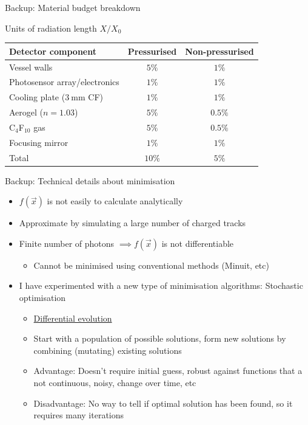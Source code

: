 \documentclass{beamer}
\begin{document}
\begin{frame}{Backup: Material budget breakdown}
  \begin{center}
    Units of radiation length $X/X_0$
    \begin{tabular}{lcc}
        \hline
        Detector component                           & Pressurised & Non-pressurised \\
        \hline
        Vessel walls                                 & $5\%$                         & $1\%$ \\
        Photosensor array/electronics                & $1\%$                         & $1\%$ \\
        Cooling plate ($\SI{3}{\milli\meter}$ CF)    & $1\%$                         & $1\%$ \\
        Aerogel ($n = 1.03$)                         & $5\%$                         & $0.5\%$ \\
        C$_4$F$_10$ gas                              & $5\%$                         & $0.5\%$ \\
        Focusing mirror                              & $1\%$                         & $1\%$ \\
        \hline
        Total                                        & $10\%$                        & $5\%$ \\
        \hline
    \end{tabular}
  \end{center}
\end{frame}

\begin{frame}{Backup: Technical details about minimisation}
  \setlength\itemsep{1.0em}
  \begin{itemize}
    \item{$f(\vec{x})$ is not easily to calculate analytically}
    \item{Approximate by simulating a large number of charged tracks}
    \item{Finite number of photons $\implies f(\vec{x})$ is not differentiable}
    \begin{itemize}
      \item{Cannot be minimised using conventional methods (Minuit, etc)}
    \end{itemize}
    \item{I have experimented with a new type of minimisation algorithms: Stochastic optimisation}
    \begin{itemize}
      \item{\href{https://en.wikipedia.org/wiki/Differential_evolution}{Differential evolution}}
      \item{Start with a population of possible solutions, form new solutions by combining (mutating) existing solutions}
      \item{Advantage: Doesn't require initial guess, robust against functions that a not continuous, noisy, change over time, etc}
      \item{Disadvantage: No way to tell if optimal solution has been found, so it requires many iterations}
    \end{itemize}
  \end{itemize}
\end{frame}
\end{document}
